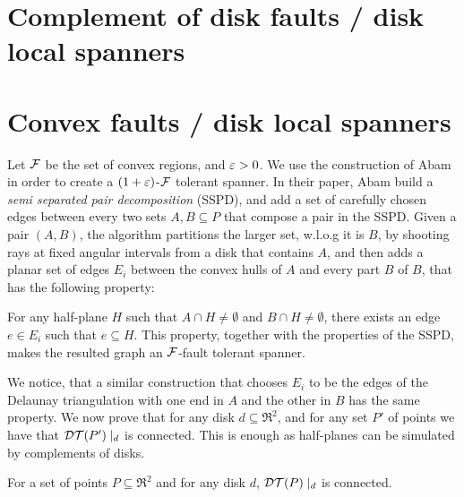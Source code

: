 \documentclass[12pt]{article}%
\begin{document}
	
\section{Complement of disk faults / disk local spanners}
	
	
\section{Convex faults / disk local spanners}
Let $\mathcal{F}$ be the set of convex regions, and $\varepsilon>0$. We use the
construction of Abam \etal \cite{abfg-rftgs-09} in order to create a
$(1+\varepsilon)$-$\mathcal{F}$ tolerant spanner. In their paper, Abam \etal build a
\emph{semi separated pair decomposition} (SSPD), and add a set of
carefully chosen edges between every two sets $A,B\subseteq P$ that
compose a pair in the SSPD. Given a pair $(A,B)$, the algorithm
partitions the larger set, w.l.o.g it is $B$, by shooting rays at
fixed angular intervals from a disk that contains $A$, and then adds a
planar set of edges $E_i$ between the convex hulls of $A$ and every
part $B$ of $B$, that has the following property:

For any half-plane $H$ such that $A\cap H\neq \emptyset$ and
$B\cap H\neq \emptyset$, there exists an edge $e\in E_i$ such that
$e\subseteq H$. This property, together with the properties of the
SSPD, makes the resulted graph an $\mathcal{F}$-fault tolerant spanner.

We notice, that a similar construction that chooses $E_i$ to be the
edges of the Delaunay triangulation with one end in $A$ and the other
in $B$ has the same property. We now prove that for any disk
$d\subseteq \Re^2$, and for any set $P'$ of points we have that
$\mathcal{DT}(P')\mid_d$ is connected. This is enough as half-planes can be
simulated by complements of disks.

\begin{claim}
    For a set of points $P\subseteq \Re^2$ and for any disk $d$,
    $\mathcal{DT}(P)\mid_d$ is connected.
\end{claim}
\end{document}

